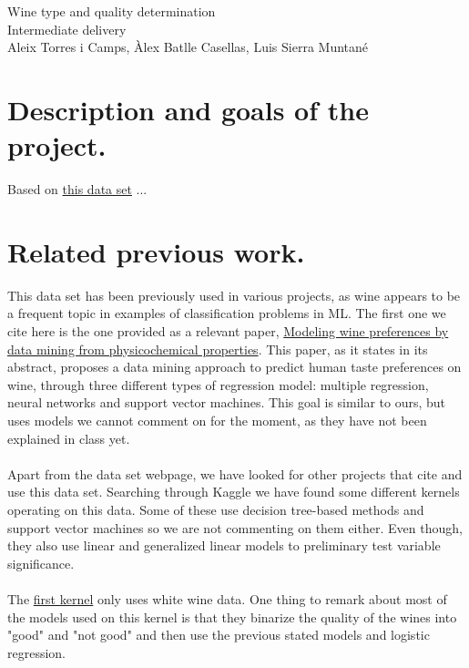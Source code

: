 \documentclass[10pt]{article}
\begin{document}
\begingroup
  \centering
  \Huge Wine type and quality determination \\
  \vskip 0.35cm
  \LARGE Intermediate delivery\\
  \vskip 0.25cm
  \large Aleix Torres i Camps, Àlex Batlle Casellas, Luis Sierra Muntané\\[1.5em]
\endgroup


\section{Description and goals of the project.}
Based on \href{http://archive.ics.uci.edu/ml/datasets/Wine+Quality}{this data set} ...

\section{Related previous work.}
This data set has been previously used in various projects, as wine appears to be a frequent topic in examples of classification problems in ML. The first one we cite here is the one provided as a relevant paper, \href{https://www.sciencedirect.com/science/article/pii/S0167923609001377?via\%3Dihub}{Modeling wine preferences by data mining from physicochemical properties}. This paper, as it states in its abstract, proposes a data mining approach to predict human taste preferences on wine, through three different types of regression model: multiple regression, neural networks and support vector machines. This goal is similar to ours, but uses models we cannot comment on for the moment, as they have not been explained in class yet. \\ \ \\
Apart from the data set webpage, we have looked for other projects that cite and use this data set. Searching through Kaggle we have found some different kernels operating on this data. Some of these use decision tree-based methods and support vector machines so we are not commenting on them either. Even though, they also use linear and generalized linear models to preliminary test variable significance. \\ \ \\
The \href{https://www.kaggle.com/indra90/predicting-white-wine-quality}{first kernel} only uses white wine data. One thing to remark about most of the models used on this kernel is that they binarize the quality of the wines into "good" and "not good" and then use the previous stated models and logistic regression. \\ \ \\
\end{document}
